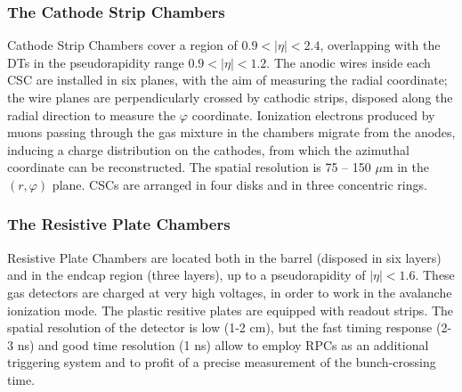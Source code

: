 \subsubsection{The Cathode Strip Chambers}
Cathode Strip Chambers cover a region of $0.9<|\eta|<2.4$, overlapping with the DTs in the pseudorapidity range $0.9 < |\eta| < 1.2$. The anodic wires inside each CSC are installed in six planes, with the aim of measuring the radial coordinate; the wire planes are perpendicularly crossed by cathodic strips, disposed along the radial direction to measure the $\varphi$ coordinate. Ionization electrons produced by muons passing through the gas mixture in the chambers migrate from the anodes, inducing a charge distribution on the cathodes, from which the azimuthal coordinate can be reconstructed. The spatial resolution %
is 75 -- 150 $\mu$m in the $(r, \varphi)$ plane. CSCs are arranged in four disks and in three concentric rings.

\subsubsection{The Resistive Plate Chambers}
Resistive Plate Chambers are located both in the barrel (disposed in six layers) and in the endcap region (three layers), up to a pseudorapidity of $|\eta|<1.6$. These gas detectors are charged at very high voltages, in order to work in the avalanche ionization mode. The plastic resitive plates are equipped with readout strips. The spatial resolution of the detector is low (1-2 cm), but the fast timing response (2-3 ns) and good time resolution (1 ns) allow to employ RPCs as an additional triggering system and to profit of a precise measurement of the bunch-crossing time.


